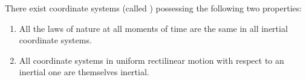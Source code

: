 There exist coordinate systems (called ) possessing the following two properties:
\begin{enumerate}
\item All the laws of nature at all moments of time are the same in all inertial coordinate systems.
\item All coordinate systems in uniform rectilinear motion with respect to an inertial one are themselves inertial.
\end{enumerate}
